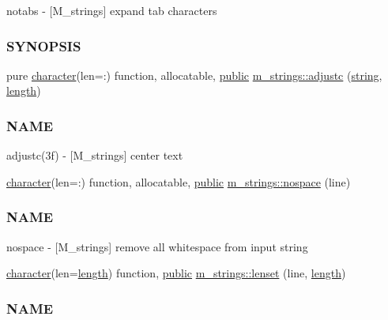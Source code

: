 \begin{DoxyCompactItemize}
\begin{DoxyCompactList}
notabs -\/ \mbox{[}M\+\_\+strings\mbox{]} expand tab characters \subsubsection*{S\+Y\+N\+O\+P\+S\+IS}\end{DoxyCompactList}\item 
pure \hyperlink{option__stopwatch_83_8txt_abd4b21fbbd175834027b5224bfe97e66}{character}(len=\+:) function, allocatable, \hyperlink{M__stopwatch_83_8txt_a2f74811300c361e53b430611a7d1769f}{public} \hyperlink{namespacem__strings_a1cacb2e45c7e3d7ed4cc1b183c35f323}{m\+\_\+strings\+::adjustc} (\hyperlink{what__overview_81_8txt_a74cb7e955273b9f9157b4f0c18a38849}{string}, \hyperlink{M__stopwatch_83_8txt_a04ed5ef37abacfa36a856b5f30376485}{length})
\begin{DoxyCompactList}\small\item\em \subsubsection*{N\+A\+ME}

adjustc(3f) -\/ \mbox{[}M\+\_\+strings\mbox{]} center text \end{DoxyCompactList}\item 
\hyperlink{option__stopwatch_83_8txt_abd4b21fbbd175834027b5224bfe97e66}{character}(len=\+:) function, allocatable, \hyperlink{M__stopwatch_83_8txt_a2f74811300c361e53b430611a7d1769f}{public} \hyperlink{namespacem__strings_ad007f050abe3d142f4a7badbc4408685}{m\+\_\+strings\+::nospace} (line)
\begin{DoxyCompactList}\small\item\em \subsubsection*{N\+A\+ME}

nospace -\/ \mbox{[}M\+\_\+strings\mbox{]} remove all whitespace from input string \end{DoxyCompactList}\item 
\hyperlink{option__stopwatch_83_8txt_abd4b21fbbd175834027b5224bfe97e66}{character}(len=\hyperlink{M__stopwatch_83_8txt_a04ed5ef37abacfa36a856b5f30376485}{length}) function, \hyperlink{M__stopwatch_83_8txt_a2f74811300c361e53b430611a7d1769f}{public} \hyperlink{namespacem__strings_a378563bb49f128bf0cf9c9d2b1f34498}{m\+\_\+strings\+::lenset} (line, \hyperlink{M__stopwatch_83_8txt_a04ed5ef37abacfa36a856b5f30376485}{length})
\begin{DoxyCompactList}\small\item\em \subsubsection*{N\+A\+ME}


\end{DoxyCompactList}
\end{DoxyCompactItemize}
